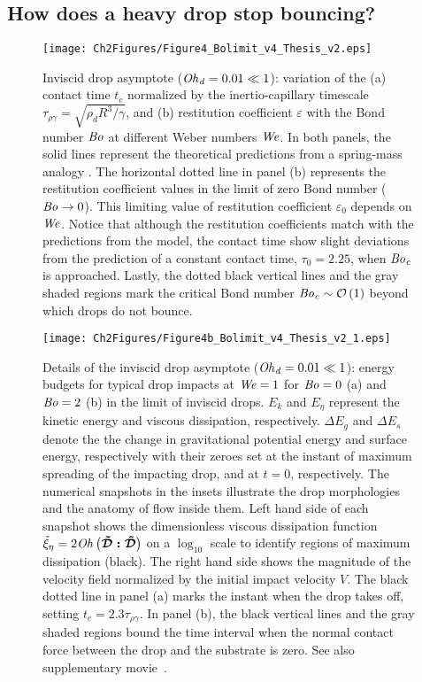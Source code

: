 \subsection{How does a heavy drop stop bouncing?}\label{sec:LimitingCases:Bo}
\begin{figure}
	\centering
	\texttt{[image: Ch2Figures/Figure4\_Bolimit\_v4\_Thesis\_v2.eps]}
	\caption{Inviscid drop asymptote ($\mathit{Oh}_\mathit{d} = 0.01 \ll 1$): variation of the (a) contact time $t_c$ normalized by the inertio-capillary timescale $\tau_{\rho\gamma} = \sqrt{\rho_dR^3/\gamma}$, and (b) restitution coefficient $\varepsilon$ with the Bond number $\mathit{Bo}$ at different Weber numbers $\mathit{We}$. In both panels, the solid lines represent the theoretical predictions from a spring-mass analogy \citep[equation~\ref{eqn:BianceEtAl_epsilon},][]{biance2006}. The horizontal dotted line in panel (b) represents the restitution coefficient values in the limit of zero Bond number ($\mathit{Bo} \to 0$). This limiting value of restitution coefficient $\varepsilon_0$ depends on $\mathit{We}$. Notice that although the restitution coefficients match with the predictions from the model, the contact time show slight deviations from the prediction of a constant contact time, $\tau_0 = 2.25$, when $\mathit{Bo}_\mathit{c}$ is approached. Lastly, the dotted black vertical lines and the gray shaded regions mark the critical Bond number $\mathit{Bo}_\mathit{c} \sim \mathcal{O}\left(1\right)$ beyond which drops do not bounce.}
	\label{fig:Bolim}
\end{figure}
\begin{figure}
	\centering
	\texttt{[image: Ch2Figures/Figure4b\_Bolimit\_v4\_Thesis\_v2\_1.eps]}
	\caption{Details of the inviscid drop asymptote ($\mathit{Oh}_\mathit{d} = 0.01 \ll 1$): energy budgets for typical drop impacts at $\mathit{We} = 1$ for $\mathit{Bo} = 0$ (a) and $\mathit{Bo} = 2$ (b) in the limit of inviscid drops. $E_k$ and $E_\eta$ represent the kinetic energy and viscous dissipation, respectively. $\Delta E_g$ and $\Delta E_s$ denote the the change in gravitational potential energy and surface energy, respectively with their zeroes set at the instant of maximum spreading of the impacting drop, and at $t = 0$, respectively. The numerical snapshots in the insets illustrate the drop morphologies and the anatomy of flow inside them. Left hand side of each snapshot shows the dimensionless viscous dissipation function $\tilde{\xi}_\eta = 2\mathit{Oh}\left(\boldsymbol{\tilde{\mathcal{D}}:\tilde{\mathcal{D}}}\right)$ on a $\log_{10}$ scale to identify regions of maximum dissipation (black). The right hand side shows the magnitude of the velocity field normalized by the initial impact velocity $V$. The black dotted line in panel (a) marks the instant when the drop takes off, setting $t_c = 2.3\tau_{\rho\gamma}$. In panel (b), the black vertical lines and the gray shaded regions bound the time interval when the normal contact force between the drop and the substrate is zero. See also supplementary movie~.}
	\label{fig:BolimDescription}
\end{figure}
